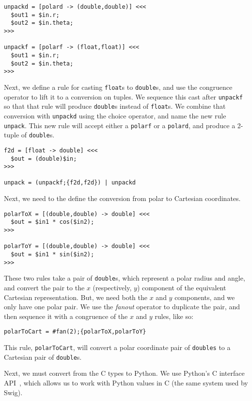 \begin{verbatim}
unpackd = [polard -> (double,double)] <<<
  $out1 = $in.r;
  $out2 = $in.theta;
>>>

unpackf = [polarf -> (float,float)] <<<
  $out1 = $in.r;
  $out2 = $in.theta;
>>>
\end{verbatim}

Next, we define a rule for casting \texttt{float}s to \texttt{double}s, and use the congruence operator to lift it to a conversion on tuples. We sequence this cast after \texttt{unpackf} so that that rule will produce \texttt{double}s instead of \texttt{float}s. We combine that conversion with \texttt{unpackd} using the choice operator, and name the new rule \texttt{unpack}. This new rule will accept either a \texttt{polarf} or a \texttt{polard}, and produce a 2-tuple of \texttt{double}s.

\begin{verbatim}
f2d = [float -> double] <<<
  $out = (double)$in;
>>>

unpack = (unpackf;{f2d,f2d}) | unpackd
\end{verbatim}

Next, we need to the define the conversion from polar to Cartesian coordinates.

\begin{verbatim}
polarToX = [(double,double) -> double] <<<
  $out = $in1 * cos($in2);  
>>>

polarToY = [(double,double) -> double] <<<
  $out = $in1 * sin($in2);
>>>
\end{verbatim}

These two rules take a pair of \texttt{double}s, which represent a polar radius and angle, and convert the pair to the $x$ (respectively, $y$) component of the equivalent Cartesian representation. But, we need both the $x$ and $y$ components, and we only have one polar pair. We use the \emph{fanout} operator to duplicate the pair, and then sequence it with a congruence of the $x$ and $y$ rules, like so:

\begin{verbatim}
polarToCart = #fan(2);{polarToX,polarToY}
\end{verbatim}

This rule, \texttt{polarToCart}, will convert a polar coordinate pair of \texttt{doubles} to a Cartesian pair of \texttt{double}s.

Next, we must convert from the C types to Python. We use Python's C interface API~\cite{python-c-api}, which allows us to work with Python values in C (the same system used by Swig).

